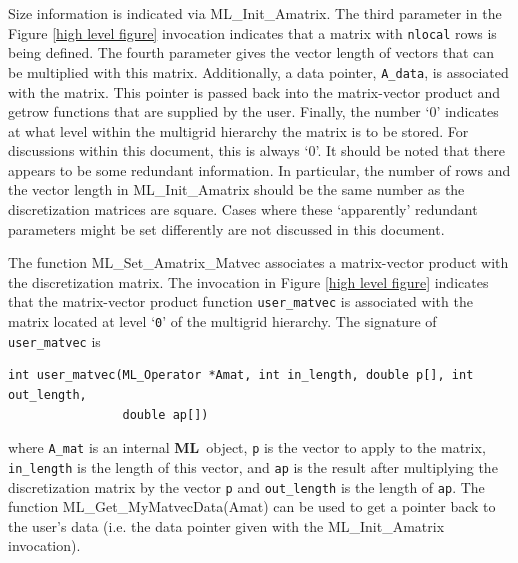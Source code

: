 \documentclass{article}[11pt]
\newcommand{\ML}     {{\bf ML}}
\begin{document}
Size information is indicated via {\sf ML\_Init\_Amatrix}. The third parameter
in the Figure \ref{high level figure} 
invocation
indicates that a matrix with {\tt nlocal} rows is being defined. The fourth parameter
gives the vector length of vectors that can be multiplied with this matrix.  
Additionally,
a data pointer, {\tt A\_data}, is associated with the matrix. This pointer 
is passed back into the matrix-vector product and getrow functions that are 
supplied by the user. Finally, the number `0' indicates at what level within
the multigrid hierarchy the matrix is to be stored. For discussions within this
document, this is always `0'. It should be noted that there appears to be some redundant
information. In particular, the number of rows and the vector length in
{\sf ML\_Init\_Amatrix} should be the same number as the discretization matrices are square.
Cases where these `apparently' redundant parameters might be set differently
are not discussed in this document.

The function {\sf ML\_Set\_Amatrix\_Matvec} associates a 
matrix-vector product with the discretization matrix.
The invocation in Figure
\ref{high level figure} indicates that the matrix-vector product
function
{\tt user\_matvec} is associated with the matrix located at level
`{\tt 0}' of the multigrid hierarchy.  The signature of {\tt user\_matvec} is
%
\begin{verbatim}
int user_matvec(ML_Operator *Amat, int in_length, double p[], int out_length, 
                double ap[])
\end{verbatim}
%
where {\tt A\_mat} is an internal \ML\ object,
{\tt p} is the vector to apply to the matrix,
{\tt in\_length} is the length of this vector, and {\tt ap} is the 
result after
multiplying the discretization matrix by the vector {\tt p} 
and {\tt out\_length}
is the length of {\tt ap}.
The function {\sf ML\_Get\_MyMatvecData(Amat)} can be used to get
a pointer back to the user's data (i.e. the data pointer given with 
the {\sf ML\_Init\_Amatrix} invocation). 
\end{document}
